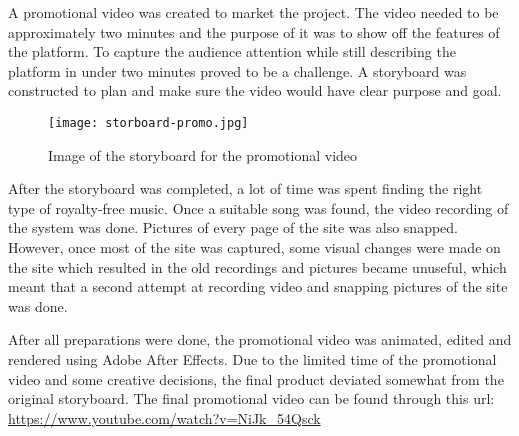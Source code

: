 A promotional video was created to market the project. The video needed to be approximately two minutes and the purpose of it was to show off the features of the platform.
To capture the audience attention while still describing the platform in under two minutes proved to be a challenge. A storyboard was constructed to plan and make sure the video would have clear purpose and goal.
\begin{figure}[h]
    \texttt{[image: storboard-promo.jpg]}
    \caption{Image of the storyboard for the promotional video}
\end{figure}
After the storyboard was completed, a lot of time was spent finding the right type of royalty-free music. Once a suitable song was found, the video recording of the system was done. Pictures of every page of the site was also snapped. However, once most of the site was captured, some visual changes were made on the site which resulted in the old recordings and pictures became unuseful, which meant that a second attempt at recording video and snapping pictures of the site was done.

After all preparations were done, the promotional video was animated, edited and rendered using Adobe After Effects. Due to the limited time of the promotional video and some creative decisions, the final product deviated somewhat from the original storyboard. The final promotional video can be found through this url: \url{https://www.youtube.com/watch?v=NiJk_54Qsck}
